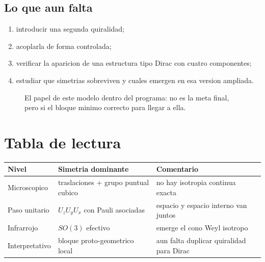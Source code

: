 \subsection{Lo que aun falta}
\begin{enumerate}[label=\arabic*.]
    \item introducir una segunda quiralidad;
    \item acoplarla de forma controlada;
    \item verificar la aparicion de una estructura tipo Dirac con cuatro componentes;
    \item estudiar que simetrias sobreviven y cuales emergen en esa version ampliada.
\end{enumerate}

\begin{figure}[h!]
\centering
{}
\caption{El papel de este modelo dentro del programa: no es la meta final, pero si el bloque minimo correcto para llegar a ella.}
\end{figure}

\section{Tabla de lectura}
\begin{center}
\begin{tabular}{p{4.1cm} p{4.8cm} p{5.3cm}}
\toprule
Nivel & Simetria dominante & Comentario \\
\midrule
Microscopico & traslaciones + grupo puntual cubico & no hay isotropia continua exacta \\
Paso unitario & \(U_zU_yU_x\) con Pauli asociadas & espacio y espacio interno van juntos \\
Infrarrojo & \(SO(3)\) efectivo & emerge el cono Weyl isotropo \\
Interpretativo & bloque proto-geometrico local & aun falta duplicar quiralidad para Dirac \\
\bottomrule
\end{tabular}
\end{center}

